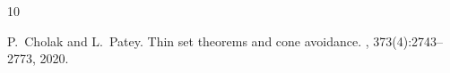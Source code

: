 \begin{thebibliography}{10}

P.~Cholak and L.~Patey.
\newblock Thin set theorems and cone avoidance.
, 373(4):2743--2773, 2020.

\end{thebibliography}
